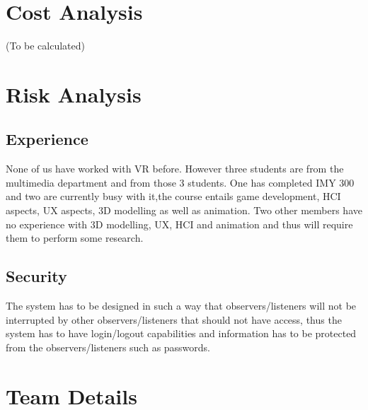 \documentclass{article}
\begin{document}
\section{Cost Analysis}
(To be calculated)


\section{Risk Analysis}
\subsection{Experience}
None of us have worked with VR before. However three students are from the multimedia department and from those 3 students. One has completed IMY 300 and two are currently busy with it,the course entails game development, HCI aspects, UX aspects, 3D modelling as well as animation. Two other members have no experience  with 3D modelling, UX, HCI and animation and thus will require them to perform some research.


\subsection{Security}
The system has to be designed in such a way that observers/listeners will not be interrupted by other observers/listeners that should not have access, thus the system has to have login/logout capabilities and information has to be protected from the observers/listeners such as passwords.

\newpage
\section{Team Details}
\end{document}
